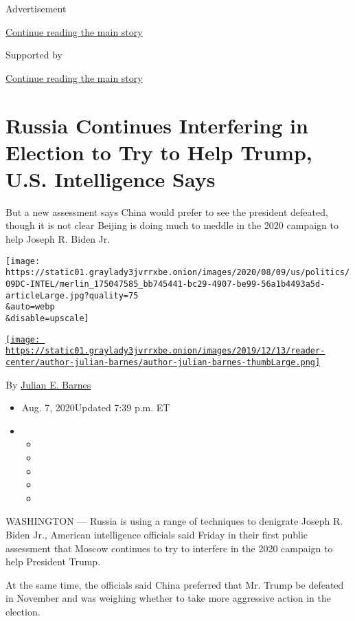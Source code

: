 Advertisement

\protect\hyperlink{after-top}{Continue reading the main story}

Supported by

\protect\hyperlink{after-sponsor}{Continue reading the main story}

\hypertarget{russia-continues-interfering-in-election-to-try-to-help-trump-us-intelligence-says}{%
\section{Russia Continues Interfering in Election to Try to Help Trump,
U.S. Intelligence
Says}\label{russia-continues-interfering-in-election-to-try-to-help-trump-us-intelligence-says}}

But a new assessment says China would prefer to see the president
defeated, though it is not clear Beijing is doing much to meddle in the
2020 campaign to help Joseph R. Biden Jr.

\texttt{[image: https://static01.graylady3jvrrxbe.onion/images/2020/08/09/us/politics/09DC-INTEL/merlin\_175047585\_bb745441-bc29-4907-be99-56a1b4493a5d-articleLarge.jpg?quality=75\\\&auto=webp\\\&disable=upscale]}

\href{https://www.nytimes3xbfgragh.onion/by/julian-e-barnes}{\texttt{[image: https://static01.graylady3jvrrxbe.onion/images/2019/12/13/reader-center/author-julian-barnes/author-julian-barnes-thumbLarge.png]}}

By \href{https://www.nytimes3xbfgragh.onion/by/julian-e-barnes}{Julian
E. Barnes}

\begin{itemize}
\item
  Aug. 7, 2020Updated 7:39 p.m. ET
\item
  \begin{itemize}
  \item
  \item
  \item
  \item
  \item
  \end{itemize}
\end{itemize}

WASHINGTON --- Russia is using a range of techniques to denigrate Joseph
R. Biden Jr., American intelligence officials said Friday in their first
public assessment that Moscow continues to try to interfere in the 2020
campaign to help President Trump.

At the same time, the officials said China preferred that Mr. Trump be
defeated in November and was weighing whether to take more aggressive
action in the election.

